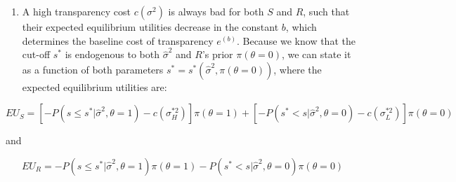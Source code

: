 \documentclass[paper=a4,12pt,DIV=11,twoside=false]{scrartcl}
\begin{document}
\begin{enumerate}
\item A high transparency cost $c(\sigma^2)$ is always bad for both $S$ and $R$, such that their expected equilibrium utilities decrease in the constant $b$, which determines the baseline cost of transparency $e^{(b)}$. Because we know that the cut-off $s^{*}$ is endogenous to both $\hat{\sigma}^2$ and $R$'s prior $\pi(\theta = 0)$, we can state it as a function of both parameters $s^{*} = s^{*}(\hat{\sigma}^2,\pi(\theta = 0))$, where the expected equilibrium utilities are:
\end{enumerate}
\begin{equation*} 
EU_S=[-P(s \leq s^{*}|\hat{\sigma}^2,\theta=1)-c(\sigma^{*2}_{H})]\pi(\theta = 1)+[-P(s^{*} < s|\hat{\sigma}^2,\theta=0)-c(\sigma^{*2}_{L})]\pi(\theta = 0) 
\end{equation*}
\begin{center}
and
\end{center}
\begin{equation*}
EU_R=-P(s \leq s^{*}|\hat{\sigma}^2,\theta=1)\pi(\theta = 1) - P(s^{*} < s|\hat{\sigma}^2,\theta=0)\pi(\theta = 0)
\end{equation*}
\end{document}
